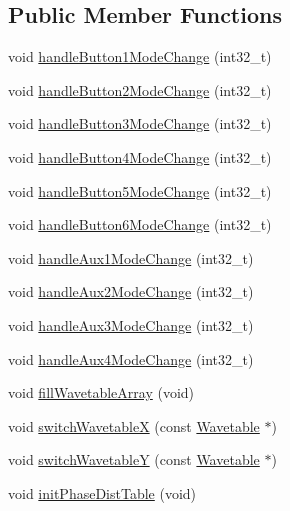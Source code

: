 \subsection*{Public Member Functions}
\begin{DoxyCompactItemize}
\item 
void \mbox{\hyperlink{class_via_scanner_a2c92da688cd2c951d41638cfc28b6000}{handle\+Button1\+Mode\+Change}} (int32\+\_\+t)
\item 
void \mbox{\hyperlink{class_via_scanner_ac3049d7a8b3d6da1056ec685c91c357b}{handle\+Button2\+Mode\+Change}} (int32\+\_\+t)
\item 
void \mbox{\hyperlink{class_via_scanner_a13f7e9239dc58018483fedd53f90b0f3}{handle\+Button3\+Mode\+Change}} (int32\+\_\+t)
\item 
void \mbox{\hyperlink{class_via_scanner_aa41f226428aa5613411690a1ae975525}{handle\+Button4\+Mode\+Change}} (int32\+\_\+t)
\item 
void \mbox{\hyperlink{class_via_scanner_ac1fba594eba26810b22c50448a560867}{handle\+Button5\+Mode\+Change}} (int32\+\_\+t)
\item 
void \mbox{\hyperlink{class_via_scanner_af1bda4e1a5bb52fb27a7dd8dd58f8548}{handle\+Button6\+Mode\+Change}} (int32\+\_\+t)
\item 
void \mbox{\hyperlink{class_via_scanner_aea0fc08e09298a474c8e8aa230828cda}{handle\+Aux1\+Mode\+Change}} (int32\+\_\+t)
\item 
void \mbox{\hyperlink{class_via_scanner_a788c12dff6fafac6fce89d843cb039e3}{handle\+Aux2\+Mode\+Change}} (int32\+\_\+t)
\item 
void \mbox{\hyperlink{class_via_scanner_a84eef50217670fe7fa71ce483d05789d}{handle\+Aux3\+Mode\+Change}} (int32\+\_\+t)
\item 
void \mbox{\hyperlink{class_via_scanner_abb34e619104b7bcce3b2cae82575396f}{handle\+Aux4\+Mode\+Change}} (int32\+\_\+t)
\item 
void \mbox{\hyperlink{class_via_scanner_a71e8d863d02095c54afab3a062e882bd}{fill\+Wavetable\+Array}} (void)
\item 
void \mbox{\hyperlink{class_via_scanner_a53c5094aba6129ac90fc42e0e6f3a242}{switch\+WavetableX}} (const \mbox{\hyperlink{struct_wavetable}{Wavetable}} $\ast$)
\item 
void \mbox{\hyperlink{class_via_scanner_adfcf70c3cef485b73bf8dea27fd3b44c}{switch\+WavetableY}} (const \mbox{\hyperlink{struct_wavetable}{Wavetable}} $\ast$)
\item 
void \mbox{\hyperlink{class_via_scanner_a67c2a00e5e65bca4c124ebb5d6677aca}{init\+Phase\+Dist\+Table}} (void)

\end{DoxyCompactItemize}
